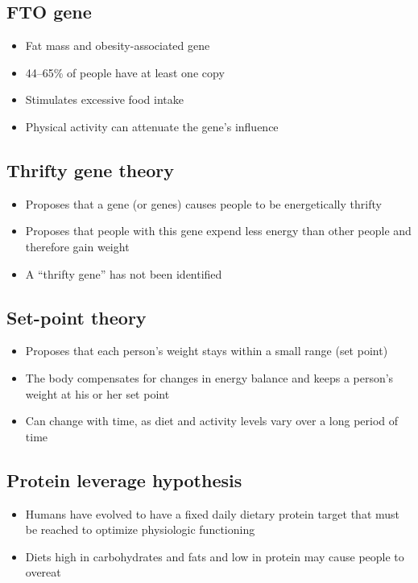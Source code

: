 \documentclass[title={Chapter 10: Achieving and Maintaining a Healthful Body Weight}]{fdsn201notes}
\begin{document}
\subsection{FTO gene}\label{subsec:fto-gene}
\begin{itemize}
	\item Fat mass and obesity-associated gene
	\item 44–65\% of people have at least one copy
	\item Stimulates excessive food intake
	\item Physical activity can attenuate the gene’s influence
\end{itemize}

\subsection{Thrifty gene theory}\label{subsec:thrifty-gene-theory}
\begin{itemize}
	\item Proposes that a gene (or genes) causes people to be energetically thrifty
	\item Proposes that people with this gene expend less energy than other people and therefore gain weight
	\item A ``thrifty gene'' has not been identified
\end{itemize}

\subsection{Set-point theory}\label{subsec:set-point-theory}
\begin{itemize}
	\item Proposes that each person’s weight stays within a small range (set point)
	\item The body compensates for changes in energy balance and keeps a person’s weight at his or her set point
	\item Can change with time, as diet and activity levels vary over a long period of time
\end{itemize}

\subsection{Protein leverage hypothesis}\label{subsec:protein-leverage-hypothesis}
\begin{itemize}
	\item Humans have evolved to have a fixed daily dietary protein target that must be reached to optimize physiologic functioning
	\item Diets high in carbohydrates and fats and low in protein may cause people to overeat
\end{itemize}
\end{document}
